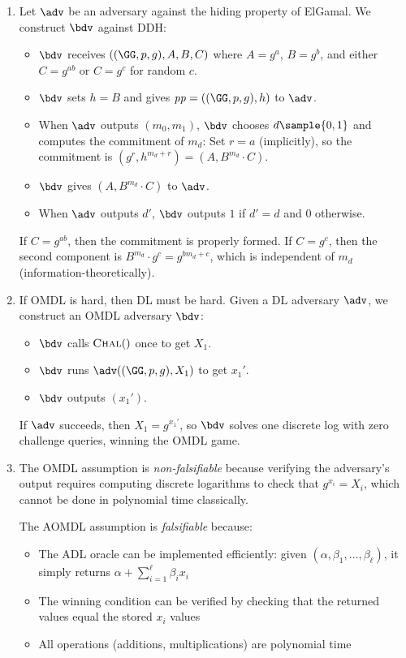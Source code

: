\begin{enumerate}
  \item Let $\adv$ be an adversary against the hiding property of ElGamal.
        We construct $\bdv$ against DDH:
        \begin{itemize}
          \item $\bdv$ receives $(\gparam, A, B, C)$ where $A = g^a$, $B = g^b$, and either $C = g^{ab}$ or $C = g^c$ for random $c$.
          \item $\bdv$ sets $h = B$ and gives $\params = (\gparam, h)$ to $\adv$.
          \item When $\adv$ outputs $(m_0, m_1)$, $\bdv$ chooses $d \sample \{0, 1\}$ and computes the commitment of $m_d$:
                Set $r = a$ (implicitly), so the commitment is $(g^r, h^{m_d + r}) = (A, B^{m_d} \cdot C)$.
          \item $\bdv$ gives $(A, B^{m_d} \cdot C)$ to $\adv$.
          \item When $\adv$ outputs $d'$, $\bdv$ outputs $1$ if $d' = d$ and $0$ otherwise.
        \end{itemize}
        If $C = g^{ab}$, then the commitment is properly formed.
        If $C = g^c$, then the second component is $B^{m_d} \cdot g^c = g^{b m_d + c}$, which is independent of $m_d$ (information-theoretically).
        
  \item If OMDL is hard, then DL must be hard.
        Given a DL adversary $\adv$, we construct an OMDL adversary $\bdv$:
        \begin{itemize}
          \item $\bdv$ calls ${\normalfont\textsc{Chal}}()$ once to get $X_1$.
          \item $\bdv$ runs $\adv(\gparam, X_1)$ to get $x_1'$.
          \item $\bdv$ outputs $(x_1')$.
        \end{itemize}
        If $\adv$ succeeds, then $X_1 = g^{x_1'}$, so $\bdv$ solves one discrete log with zero challenge queries, winning the OMDL game.
        
  \item The OMDL assumption is \emph{non-falsifiable} because verifying the adversary's output requires computing discrete logarithms to check that $g^{x_i} = X_i$, which cannot be done in polynomial time classically.
        
        The AOMDL assumption is \emph{falsifiable} because:
        \begin{itemize}
          \item The ADL oracle can be implemented efficiently: given $(\alpha, \beta_1, \ldots, \beta_\ell)$, it simply returns $\alpha + \sum_{i=1}^\ell \beta_i x_i$
          \item The winning condition can be verified by checking that the returned values equal the stored $x_i$ values
          \item All operations (additions, multiplications) are polynomial time
        \end{itemize}
        

\end{enumerate}
